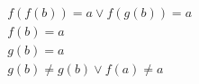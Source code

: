 \begin{align*}
%
& f(f(b)) = a \lor f(g(b)) = a
~\\~
& f(b) = a
~\\~
& g(b) = a
~\\~
& g(b)  \neq  g(b) \lor f(a)  \neq  a
%
\end{align*}
